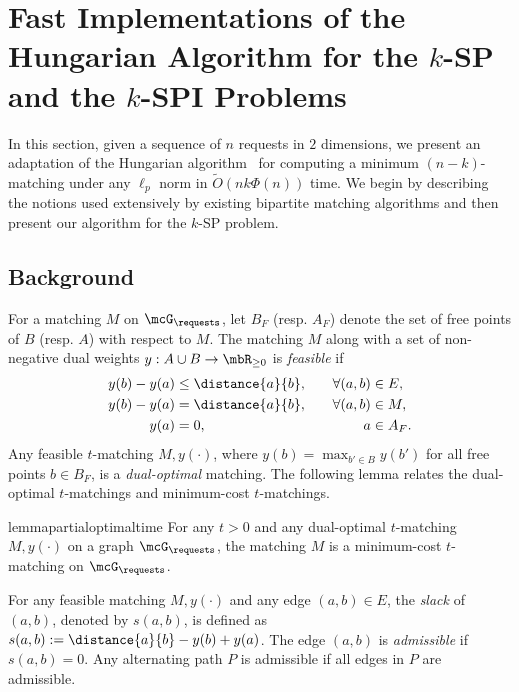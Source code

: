 %
\section{Fast Implementations of the Hungarian Algorithm for the \texorpdfstring{$k$}{-}-SP and the \texorpdfstring{$k$}{-}-SPI Problems}\label{sec:nk-algod}
In this section, given a sequence of $n$ requests in $2$ dimensions, we present an adaptation of the Hungarian algorithm~\cite{kuhn1955hungarian} for computing a minimum $(n-k)$-matching under any $\ell_p$ norm in $\tilde{O}(nk\Phi(n))$ time.  We begin by describing the notions used extensively by existing bipartite matching algorithms and then present our algorithm for the $k$-SP problem.


\subsection{Background}
For a matching $M$ on $\mcG_\requests$, let $B_F$ (resp. $A_F$) denote the set of free points of $B$ (resp. $A$) with respect to $M$. The matching $M$ along with a set of non-negative dual weights $y:A\cup B\rightarrow \mbR_{\ge0}$ is \emph{feasible} if 
\begin{align}
    y(b) - y(a) &\le \distance{a}{b},&  \quad \forall(a,b)&\in E,\label{eq:dualfeasibility-non-matching}\\
    y(b) - y(a) &= \distance{a}{b},& \quad \forall(a,b)&\in M,\label{eq:dualfeasibility-matching}\\
    y(a) &= 0,& \quad a&\in A_F.\label{eq:dualfeasibility-free_a-nk}
\end{align}
%
%
%
%
Any feasible $t$-matching $M, y(\cdot)$, where $y(b)=\max_{b'\in B} y(b')$ for all free points $b\in B_F$, is a \emph{dual-optimal} matching. 
The following lemma relates the dual-optimal $t$-matchings and minimum-cost $t$-matchings.

\begin{restatable}{lemma}{partialoptimaltime}\label{lemma:partial-optimal-time}
    For any $t>0$ and any dual-optimal $t$-matching $M, y(\cdot)$ on a graph $\mcG_\requests$, the matching $M$ is a minimum-cost $t$-matching on $\mcG_\requests$.
\end{restatable}


For any feasible matching $M, y(\cdot)$ and any edge $(a,b)\in E$, the \emph{slack} of $(a,b)$, denoted by $s(a,b)$, is defined as $s(a,b):=\distance{a}{b} - y(b) + y(a)$. The edge $(a,b)$ is \emph{admissible} if $s(a,b)=0$. Any alternating path $P$ is admissible if all edges in $P$ are admissible. 


